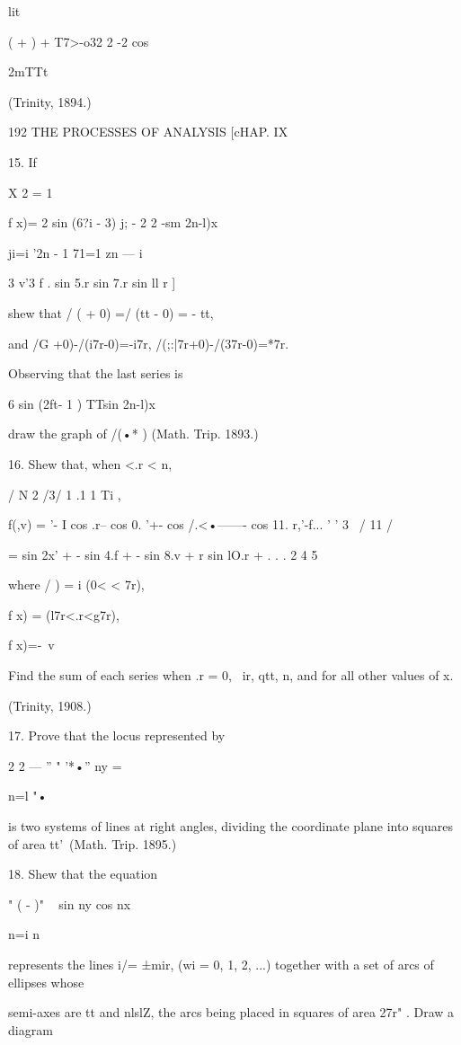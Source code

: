 {lit



( + ) + T7>-o32 2 -2 cos



2mTTt



(Trinity, 1894.)



192 THE PROCESSES OF ANALYSIS [cHAP. IX

15. If

X 2 = 1

f x)= 2 sin (6?i - 3) j; - 2 2 -sm 2n-l)x

ji=i '2n - 1 71=1 zn — i

3 v'3 f . sin 5.r sin 7.r sin ll r ]

shew that / ( + 0) =/ (tt - 0) = - tt,

and /G +0)-/(i7r-0)=-i7r, /(;:|7r+0)-/(37r-0)=*7r.

Observing that the last series is

6 sin (2ft- 1 ) TTsin 2n-l)x

draw the graph of /(•* ) (Math. Trip. 1893.)

16. Shew that, when <.r < n,

 / N 2 /3/ 1 .1 1 Ti , \

f(,v) = '- I cos .r-- cos 0. '+- cos /.<•——- cos 11. r,'-f... ' ' 3 \
/ 11 /

= sin 2x' + - sin 4.f + - sin 8.v + r sin lO.r + . . . 2 4 5

where / ) = i (0< < 7r),

f x) = (l7r<.r<g7r),

f x)=-\ v %

Find the sum of each series when .r = 0, \ ir, qtt, n, and for all
other values of x.

(Trinity, 1908.)

17. Prove that the locus represented by

2 2 — '' " '*•'' ny =

n=l "•

is two systems of lines at right angles, dividing the coordinate plane
into squares of area tt'\ (Math. Trip. 1895.)

18. Shew that the equation

" ( - )" ~ sin ny cos nx \

n=i n ~

represents the lines i/= ±mir, (wi = 0, 1, 2, ...) together with a set
of arcs of ellipses whose

semi-axes are tt and nlslZ, the arcs being placed in squares of area
27r" . Draw a diagram

}

